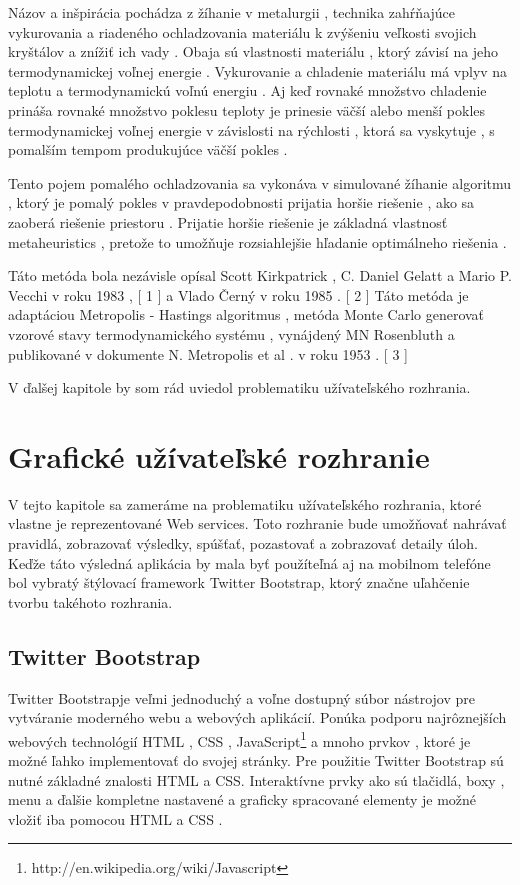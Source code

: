 \begin{itemize}
\begin{itemize}
Názov a inšpirácia pochádza z žíhanie v metalurgii , technika zahŕňajúce vykurovania a riadeného ochladzovania materiálu k zvýšeniu veľkosti svojich kryštálov a znížiť ich vady . Obaja sú vlastnosti materiálu , ktorý závisí na jeho termodynamickej voľnej energie . Vykurovanie a chladenie materiálu má vplyv na teplotu a termodynamickú voľnú energiu . Aj keď rovnaké množstvo chladenie prináša rovnaké množstvo poklesu teploty je prinesie väčší alebo menší pokles termodynamickej voľnej energie v závislosti na rýchlosti , ktorá sa vyskytuje , s pomalším tempom produkujúce väčší pokles .

Tento pojem pomalého ochladzovania sa vykonáva v simulované žíhanie algoritmu , ktorý je pomalý pokles v pravdepodobnosti prijatia horšie riešenie , ako sa zaoberá riešenie priestoru . Prijatie horšie riešenie je základná vlastnosť metaheuristics , pretože to umožňuje rozsiahlejšie hľadanie optimálneho riešenia .

Táto metóda bola nezávisle opísal Scott Kirkpatrick , C. Daniel Gelatt a Mario P. Vecchi v roku 1983 , [ 1 ] a Vlado Černý v roku 1985 . [ 2 ] Táto metóda je adaptáciou Metropolis - Hastings algoritmus , metóda Monte Carlo generovať vzorové stavy termodynamického systému , vynájdený MN Rosenbluth a publikované v dokumente N. Metropolis et al . v roku 1953 . [ 3 ]

\end{itemize}

\end{itemize}


V ďalšej kapitole by som rád uviedol problematiku užívateľského rozhrania.
\chapter{Grafické užívateľské rozhranie}
V tejto kapitole sa zameráme na problematiku užívateľského rozhrania, ktoré vlastne je reprezentované Web services. Toto rozhranie bude umožňovať nahrávať pravidlá, zobrazovať výsledky, spúšťať, pozastovať a zobrazovať detaily úloh. Keďže táto výsledná aplikácia by mala byť použíteľná aj na mobilnom telefóne bol vybratý štýlovací framework Twitter Bootstrap, ktorý značne uľahčenie tvorbu takéhoto rozhrania.

\section{Twitter Bootstrap}
Twitter Bootstrapje veľmi jednoduchý a voľne dostupný súbor nástrojov pre vytváranie moderného webu a webových aplikácií.\cite{boot} Ponúka podporu najrôznejších webových technológií HTML , CSS , JavaScript\footnote{http://en.wikipedia.org/wiki/Javascript} a mnoho prvkov , ktoré je možné ľahko implementovať do svojej stránky. Pre použitie Twitter Bootstrap sú nutné základné znalosti HTML a CSS. Interaktívne prvky ako sú tlačidlá, boxy , menu a ďalšie kompletne nastavené a graficky spracované elementy je možné vložiť iba pomocou HTML a CSS .

